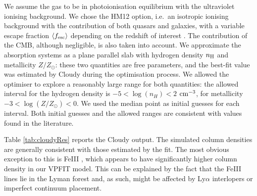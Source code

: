 \documentclass[fleqn,usenatbib]{mnras}
\makeatletter
\DeclareRobustCommand{\ion}[2]{%
  \mbox{#1\check@mathfonts\fontsize\sf@size\z@\selectfont #2}%
}
\makeatother
\begin{document}
We assume the gas to be in photoionisation equilibrium with the ultraviolet ionising background. We chose the HM12 option, i.e.\ an isotropic ionising background with the contribution of both quasars and galaxies, with a variable escape fraction $\langle f_{\rm esc}\rangle$ depending on the redshift of interest \citep{HM12}. The contribution of the CMB, although negligible, is also taken into account. We approximate the absorption systems as a plane parallel slab with hydrogen density $n_{\rm H}$ and metallicity $Z/Z_\odot$: these two quantities are free parameters, and the best-fit value was estimated by Cloudy during the optimisation process. We allowed the optimiser to explore a reasonably large range for both quantities: the allowed interval for the hydrogen density is $-5 < \log{(n_H)} < 2$ ${\rm cm^{-3}}$, for metallicity $-3 < \log{(Z/Z_\odot)} < 0$. We used the median point as initial guesses for each interval. Both initial guesses and the allowed ranges are consistent with values found in the literature.

Table \ref{tab:cloudyRes} reports the Cloudy output. The simulated column densities are generally consistent with those estimated by the fit. The most obvious exception to this is \ion{Fe}{III}, which appears to have significantly higher column density in our VPFIT model. This can be explained by the fact that the \ion{Fe}{III} lines lie in the Lyman forest and, as such, might be affected by Ly$\alpha$ interlopers or imperfect continuum placement.
\end{document}
